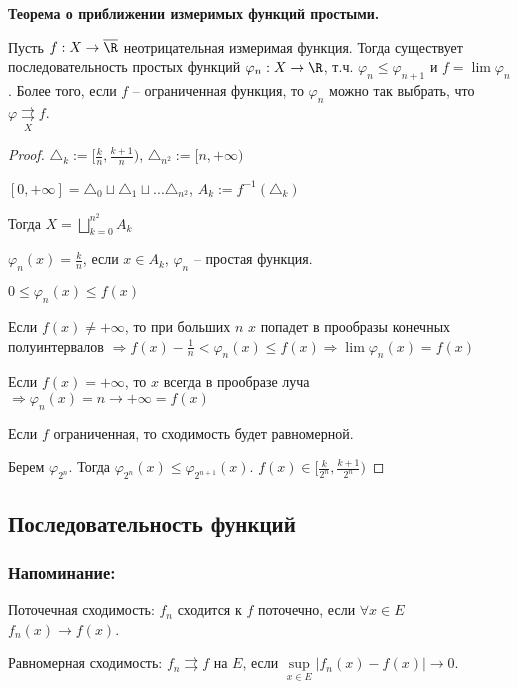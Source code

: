 \begin{theorem}
    \textbf{Теорема о приближении измеримых функций простыми.}

    Пусть $f:X\rightarrow \overline{\R}$ неотрицательная измеримая функция. Тогда 
    существует последовательность простых функций $\varphi_n: X\rightarrow \R$, т.ч. 
    $\varphi_n\leq \varphi_{n+1}$ и $f=\lim \varphi_n$. Более того, если $f$ – ограниченная 
    функция, то $\varphi_n$ можно так выбрать, что $\varphi\underset{X}{\rightrightarrows} f$.
\end{theorem}

\begin{proof}
    $\triangle_k:=[\frac{k}{n}, \frac{k+1}{n})$, $\triangle_{n^2}:=[n, +\infty)$

    $[0, +\infty]=\triangle_0\sqcup\triangle_1\sqcup ...\triangle_{n^2}$, $A_k:=f^{-1}(\triangle_k)$

    Тогда $X=\bigsqcup\limits_{k=0}^{n^2}A_k$

    $\varphi_n(x)=\frac{k}{n}$, если $x\in A_k$, $\varphi_n$ – простая функция.

    $0\leq \varphi_n(x) \leq f(x)$

    Если $f(x)\not = +\infty$, то при больших $n$ $x$ попадет в прообразы конечных полуинтервалов 
    $\Rightarrow f(x)-\frac{1}{n}< \varphi_n(x)\leq f(x)\Rightarrow \lim \varphi_n(x)=f(x)$

    Если $f(x)=+\infty$, то $x$ всегда в прообразе луча $\Rightarrow\varphi_n(x) = n \rightarrow +\infty=f(x)$

    Если $f$ ограниченная, то сходимость будет равномерной.

    Берем $\varphi_{2^n}$. Тогда $\varphi_{2^n}(x)\leq \varphi_{2^{n+1}}(x)$. $f(x)\in [\frac{k}{2^n}, \frac{k+1}{2^{n}})$
\end{proof}

\subsection{Последовательность функций}

\subsubsection*{Напоминание:}

Поточечная сходимость: $f_n$ сходится к $f$ поточечно, если $\forall x\in E$
$f_n (x)\rightarrow f(x)$.

Равномерная сходимость: $f_n\rightrightarrows f$ на $E$, если $\underset{x\in E}{\sup} |f_n(x)-f(x)|\rightarrow 0$.

